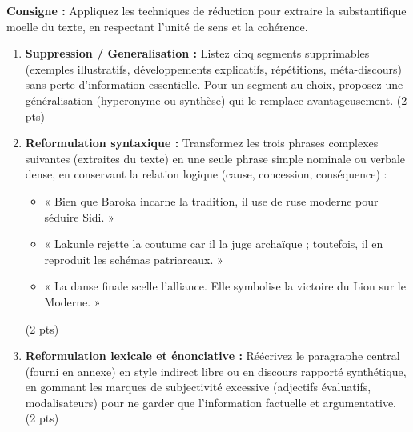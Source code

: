 \documentclass[11pt]{article}
\begin{document}
\begin{exercice}
\textbf{Consigne :} Appliquez les techniques de réduction pour extraire la substantifique moelle du texte, en respectant l'unité de sens et la cohérence.
\begin{enumerate}
    \item \textbf{Suppression / Generalisation :} Listez cinq segments supprimables (exemples illustratifs, développements explicatifs, répétitions, méta-discours) sans perte d'information essentielle. Pour un segment au choix, proposez une généralisation (hyperonyme ou synthèse) qui le remplace avantageusement. (2 pts)
    \item \textbf{Reformulation syntaxique :} Transformez les trois phrases complexes suivantes (extraites du texte) en une seule phrase simple nominale ou verbale dense, en conservant la relation logique (cause, concession, conséquence) :
    \begin{itemize}
        \item « Bien que Baroka incarne la tradition, il use de ruse moderne pour séduire Sidi. »
        \item « Lakunle rejette la coutume car il la juge archaïque ; toutefois, il en reproduit les schémas patriarcaux. »
        \item « La danse finale scelle l'alliance. Elle symbolise la victoire du Lion sur le Moderne. »
    \end{itemize}
    (2 pts)
    \item \textbf{Reformulation lexicale et énonciative :} Réécrivez le paragraphe central (fourni en annexe) en style indirect libre ou en discours rapporté synthétique, en gommant les marques de subjectivité excessive (adjectifs évaluatifs, modalisateurs) pour ne garder que l'information factuelle et argumentative. (2 pts)
\end{enumerate}
\end{exercice}
\end{document}

